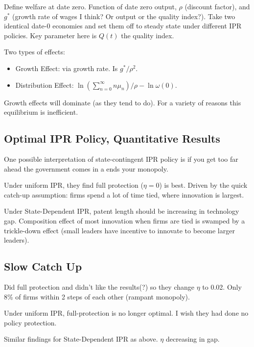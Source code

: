\documentclass[11pt]{article}
\begin{document}
    Define welfare at date zero.  Function of date zero output, $\rho$ (discount factor), and $g^*$ (growth rate of wages I think? Or output or the quality index?). Take two identical date-0 economies and set them off to steady state under different IPR policies.  Key parameter here is $Q(t)$ the quality index.

    Two types of effects:
    \begin{itemize}
      \item Growth Effect: via growth rate.  Is $g^*/\rho^2$.
      \item Distribution Effect: $\ln(\sum_{n=0}^{\infty} n\mu_n)/\rho - \ln\omega(0)$.
    \end{itemize}

    Growth effects will dominate (as they tend to do).  For a variety of reasons this equilibrium is inefficient.

\subsection{Optimal IPR Policy, Quantitative Results}
\label{sub:optimal_ipr_policy_quantitative_results}

  One possible interpretation of state-contingent IPR policy is if you get too far ahead the government comes in a ends your monopoly.

  Under uniform IPR, they find full protection ($\eta = 0$) is best.  Driven by the quick catch-up assumption: firms spend a lot of time tied, where innovation is largest.

  Under State-Dependent IPR, patent length should be increasing in technology gap.  Composition effect of most innovation when firms are tied is swamped by a trickle-down effect (small leaders have incentive to innovate to become larger leaders).

\subsection{Slow Catch Up}
\label{sub:slow_catch_up}

  Did full protection and didn't like the results(?) so they change $\eta$ to 0.02. Only 8\% of firms within 2 steps of each other (rampant monopoly).

  Under uniform IPR, full-protection is no longer optimal.  I wish they had done no policy protection. 

  Similar findings for State-Dependent IPR as above.  $\eta$ decreasing in gap.
\end{document}
